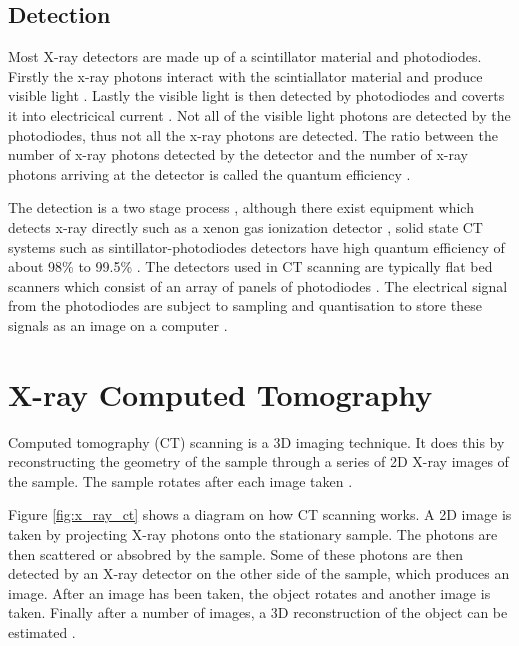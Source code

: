 \subsection{Detection}
Most X-ray detectors are made up of a scintillator material \citep{greskovich1997ceramic} and photodiodes. Firstly the x-ray photons interact with the scintiallator material and produce visible light \citep{rossner1993conversion}. Lastly the visible light is then detected by photodiodes and coverts it into electricical current \citep{michael2001x}. Not all of the visible light photons are detected by the photodiodes, thus not all the x-ray photons are detected. The ratio between the number of x-ray photons detected by the detector and the number of x-ray photons arriving at the detector is called the quantum efficiency \citep{cierniak2011x}.

The detection is a two stage process \citep{cierniak2011x}, although there exist equipment which detects x-ray directly such as a xenon gas ionization detector \citep{fuchs2000direct}, solid state CT systems such as sintillator-photodiodes detectors have high quantum efficiency of about 98\% to 99.5\% \citep{hsieh2000investigation}. The detectors used in CT scanning are typically flat bed scanners which consist of an array of panels of photodiodes \citep{cantatore2011introduction}. The electrical signal from the photodiodes are subject to sampling and quantisation to store these signals as an image on a computer \citep{cierniak2011x}.

\section{X-ray Computed Tomography}
Computed tomography (CT) scanning is a 3D imaging technique. It does this by reconstructing the geometry of the sample through a series of 2D X-ray images of the sample. The sample rotates after each image taken \citep{cantatore2011introduction}.

Figure \ref{fig:x_ray_ct} shows a diagram on how CT scanning works. A 2D image is taken by projecting X-ray photons onto the stationary sample. The photons are then scattered or absobred by the sample.  Some of these photons are then detected by an X-ray detector on the other side of the sample, which produces an image. After an image has been taken, the object rotates and another image is taken. Finally after a number of images, a 3D reconstruction of the object can be estimated \citep{cantatore2011introduction}.

